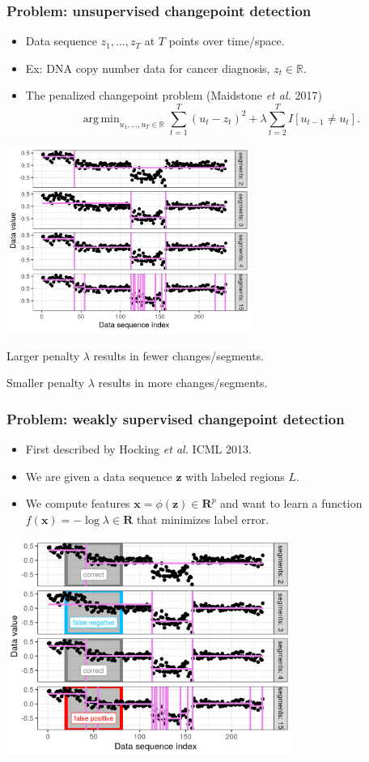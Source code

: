\documentclass{beamer}
\DeclareMathOperator*{\argmin}{arg\,min}
\begin{document}
\begin{frame}
  \frametitle{Problem: unsupervised changepoint detection}
  \begin{itemize}
  \item Data sequence $z_1,\dots,z_T$ at $T$ points over time/space.
  \item Ex: DNA copy number data for cancer diagnosis, $z_t\in\mathbb R$.
  \item The penalized changepoint problem (Maidstone \emph{et al.} 2017)
$$\argmin_{u_1,\dots,u_T\in\mathbb R} \sum_{t=1}^T (u_t - z_t)^2 + \lambda\sum_{t=2}^T I[u_{t-1} \neq u_t].$$
  \end{itemize}

  \parbox{0.6\textwidth}{
\includegraphics[width=0.6\textwidth]{figure-fn-not-monotonic-no-labels}
}
\parbox{0.3\textwidth}{
  Larger penalty $\lambda$ results in fewer changes/segments.

  \vskip 0.5in

  Smaller penalty $\lambda$ results in more changes/segments.
}

\end{frame}


\begin{frame}
  \frametitle{Problem: weakly supervised changepoint detection}
  \begin{itemize}
  \item First described by Hocking \emph{et al.} ICML 2013.
  \item We are given a data sequence $\mathbf z$ with labeled regions
    $L$.
  \item We compute features $\mathbf x=\phi(\mathbf z)\in\mathbf R^p$
    and want to learn a function $f(\mathbf x)=-\log\lambda\in\mathbf R$ that minimizes label
    error.
  \end{itemize}

  \includegraphics[width=0.7\textwidth]{figure-fn-not-monotonic}

\end{frame}
\end{document}
